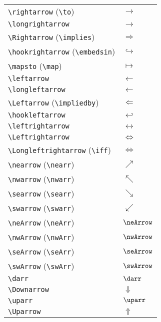 \documentclass[text,xhtml,itex]{internet}
\begin{document}
\begin{tabular}{ll}
\verb+\rightarrow+ (\verb+\to+)                   & \(\rightarrow\)\\
\verb+\longrightarrow+                       & \(\longrightarrow\)\\
\verb+\Rightarrow+ (\verb+\implies+)              & \(\Rightarrow\)\\
\verb+\hookrightarrow+ (\verb+\embedsin+)         & \(\hookrightarrow\)\\
\verb+\mapsto+ (\verb+\map+)                      & \(\mapsto\)\\
\verb+\leftarrow+                            & \(\leftarrow\)\\
\verb+\longleftarrow+                        & \(\longleftarrow\)\\
\verb+\Leftarrow+ (\verb+\impliedby+)             & \(\Leftarrow\)\\
\verb+\hookleftarrow+                        & \(\hookleftarrow\)\\
\verb+\leftrightarrow+                       & \(\leftrightarrow\)\\
\verb+\Leftrightarrow+                       & \(\Leftrightarrow\)\\
\verb+\Longleftrightarrow+ (\verb+\iff+)          & \(\Longleftrightarrow\)\\
\verb+\nearrow+ (\verb+\nearr+)                   & \(\nearrow\)\\
\verb+\nwarrow+ (\verb+\nwarr+)                   & \(\nwarrow\)\\
\verb+\searrow+ (\verb+\searr+)                   & \(\searrow\)\\
\verb+\swarrow+ (\verb+\swarr+)                   & \(\swarrow\)\\
\verb+\neArrow+ (\verb+\neArr+)                   & \(\neArrow\)\\
\verb+\nwArrow+ (\verb+\nwArr+)                   & \(\nwArrow\)\\
\verb+\seArrow+ (\verb+\seArr+)                   & \(\seArrow\)\\
\verb+\swArrow+ (\verb+\swArr+)                   & \(\swArrow\)\\
\verb+\darr+                                 & \(\darr\)\\
\verb+\Downarrow+                            & \(\Downarrow\)\\
\verb+\uparr+                                & \(\uparr\)\\
\verb+\Uparrow+                              & \(\Uparrow\)\\

\end{tabular}
\end{document}
